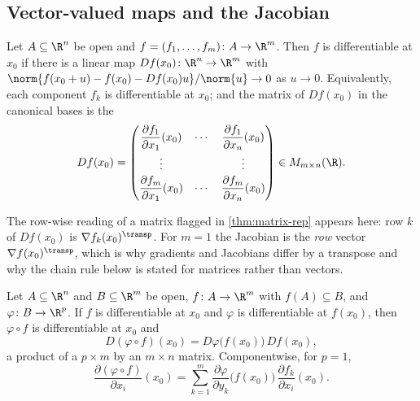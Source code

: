 \subsection{Vector-valued maps and the Jacobian}

\begin{definition}[Jacobian]\label{def:jacobian}
	Let $A\subseteq\R^n$ be open and $f=(f_1,\dots,f_m)\colon A\to\R^m$. Then $f$
	is differentiable at $x_0$ if there is a linear map
	$Df(x_0)\colon\R^n\to\R^m$ with
	$\norm{f(x_0+u)-f(x_0)-Df(x_0)u}/\norm{u}\to0$ as $u\to0$. Equivalently, each
	component $f_k$ is differentiable at $x_0$; and the matrix of $Df(x_0)$ in the
	canonical bases is the 
	\[
		Df(x_0)=\begin{pmatrix}
			\dfrac{\partial f_1}{\partial x_1}(x_0) & \cdots & \dfrac{\partial f_1}{\partial x_n}(x_0) \\[1.5ex]
			\vdots                                  &        & \vdots                                  \\[0.5ex]
			\dfrac{\partial f_m}{\partial x_1}(x_0) & \cdots & \dfrac{\partial f_m}{\partial x_n}(x_0)
		\end{pmatrix}\in M_{m\times n}(\R).
	\]
\end{definition}

The row-wise reading of a matrix flagged in \autoref{thm:matrix-rep} appears
here: row $k$ of $Df(x_0)$ is $\nabla f_k(x_0)^{\transp}$. For $m=1$ the
Jacobian is the \emph{row} vector $\nabla f(x_0)^{\transp}$, which is why
gradients and Jacobians differ by a transpose and why the chain rule below is
stated for matrices rather than vectors.

\begin{theorem}\label{thm:chain-rule}
	Let $A\subseteq\R^n$ and $B\subseteq\R^m$ be open, $f\colon A\to\R^m$ with
	$f(A)\subseteq B$, and $\varphi\colon B\to\R^p$. If $f$ is differentiable at
	$x_0$ and $\varphi$ is differentiable at $f(x_0)$, then $\varphi\circ f$ is
	differentiable at $x_0$ and
	\begin{equation}\label{eq:chain-rule}
		D(\varphi\circ f)(x_0)=D\varphi\bigl(f(x_0)\bigr)\,Df(x_0),
	\end{equation}
	a product of a $p\times m$ by an $m\times n$ matrix. Componentwise, for
	$p=1$,
	\begin{equation}\label{eq:chain-rule-components}
		\frac{\partial(\varphi\circ f)}{\partial x_i}(x_0)
		=\sum_{k=1}^{m}\frac{\partial\varphi}{\partial y_k}\bigl(f(x_0)\bigr)\,
		\frac{\partial f_k}{\partial x_i}(x_0).
	\end{equation}
\end{theorem}

